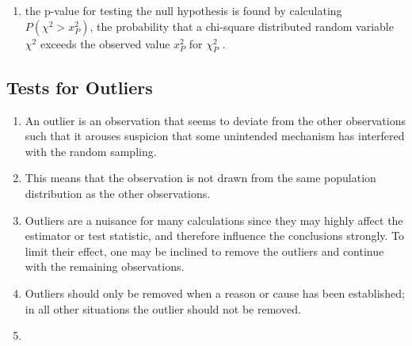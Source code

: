 \begin{enumerate}
    \item the p-value for testing the null hypothesis is found by calculating $P(\chi^2 > x^2_P )$, the probability that a chi-square distributed random variable $\chi^2$ exceeds the observed value $x^2_P$ for $\chi^2_P$ .
    \hfill \cite{statistics/book/Statistics-for-Data-Scientists/Maurits-Kaptein}

\end{enumerate}






\subsection{Tests for Outliers}

\begin{enumerate}
    \item An outlier is an observation that seems to deviate from the other observations such that it arouses suspicion that some unintended mechanism has interfered with the random sampling. 
    \hfill \cite{statistics/book/Statistics-for-Data-Scientists/Maurits-Kaptein}
    
    \item This means that the observation is not drawn from the same population distribution as the other observations.
    \hfill \cite{statistics/book/Statistics-for-Data-Scientists/Maurits-Kaptein}

    \item Outliers are a nuisance for many calculations since they may highly affect the estimator or test statistic, and therefore influence the conclusions strongly. 
    To limit their effect, one may be inclined to remove the outliers and continue with the remaining observations. 
    \hfill \cite{statistics/book/Statistics-for-Data-Scientists/Maurits-Kaptein}

    \item Outliers should only be removed when a reason or cause has been established; in all other situations the outlier should not be removed.
    \hfill \cite{statistics/book/Statistics-for-Data-Scientists/Maurits-Kaptein}

    \item 
    \hfill \cite{statistics/book/Statistics-for-Data-Scientists/Maurits-Kaptein}
\end{enumerate}
















